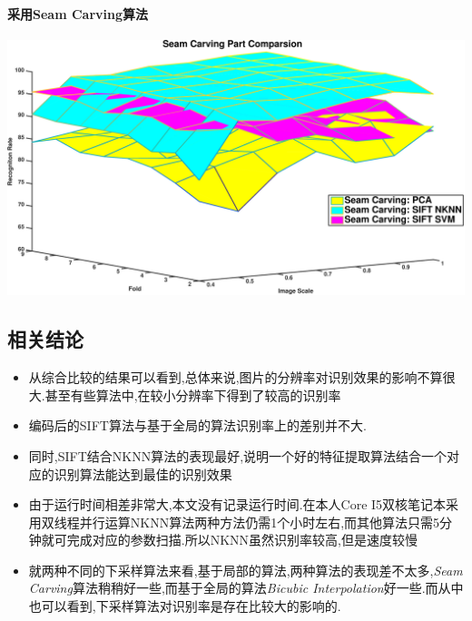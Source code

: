 \paragraph{采用Seam Carving算法}
\begin{center}
\begin{minipage}[t]{\linewidth}
\center
{
\captionsetup{justification=centering}
\includegraphics[width=\textwidth]{Img/c4/glo_comp_seamcar} 
}
\end{minipage}
\medskip
\end{center}

\subsection{相关结论}
\begin{itemize}
	\item 从综合比较的结果可以看到,总体来说,图片的分辨率对识别效果的影响不算很大.甚至有些算法中,在较小分辨率下得到了较高的识别率
	\item 编码后的SIFT算法与基于全局的算法识别率上的差别并不大.
	\item 同时,SIFT结合NKNN算法的表现最好,说明一个好的特征提取算法结合一个对应的识别算法能达到最佳的识别效果
	\item 由于运行时间相差非常大,本文没有记录运行时间.在本人Core I5双核笔记本采用双线程并行运算NKNN算法两种方法仍需1个小时左右,而其他算法只需5分钟就可完成对应的参数扫描.所以NKNN虽然识别率较高,但是速度较慢
	
	\item 就两种不同的下采样算法来看,基于局部的算法,两种算法的表现差不太多,\textit{Seam Carving}算法稍稍好一些,而基于全局的算法\textit{Bicubic Interpolation}好一些.而从中也可以看到,下采样算法对识别率是存在比较大的影响的.
\end{itemize}


